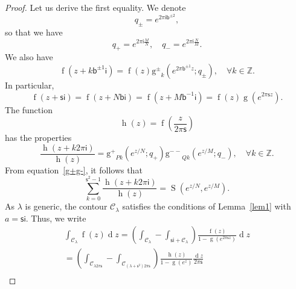\documentclass[12pt]{amsart}
\theoremstyle{definition}
\newcommand{\im}{\mathsf{i}}
\begin{document}
\begin{proof}
Let us derive the first equality. We denote
\begin{equation}
q_\pm= e^{2\pi\im\mathsf{b}^{\pm2}},
\end{equation}
so that we have
\begin{equation}
q_+=e^{2\pi\im\frac MN},\quad q_-=e^{2\pi\im\frac NM}.
\end{equation}
We also have
\begin{equation}
\operatorname{f}(z+k\mathsf{b}^{\pm1}\im)=\operatorname{f}(z)
\operatorname{g^\pm}_{k}\!\left(e^{2\pi\mathsf{b}^{\pm1}z};q_\pm\right), 
\quad \forall k\in\mathbb{Z}.
\end{equation}
In particular,
\begin{equation}
\operatorname{f}(z+\mathsf{s}\im)=\operatorname{f}(z+N\mathsf{b}\im)=
\operatorname{f}(z+M\mathsf{b}^{-1}\im)=
\operatorname{f}(z)\operatorname{g}\!\left(e^{2\pi\mathsf{s}z}\right).
\end{equation}
The function
\begin{equation}\label{hf}
\operatorname{h}(z)= \operatorname{f}\!
\left(\frac z{2\pi\mathsf{s}}\right)
\end{equation}
has the properties
\begin{equation}\label{g+g-}
\frac{\operatorname{h}(z+k2\pi \im)}{\operatorname{h}(z)}=
\operatorname{g^+}_{Pk}\!\left(e^{z/N};q_+\right)
\operatorname{g^{--}}_{Qk}\!\left(e^{z/M};q_-\right),\quad \forall k\in\mathbb{Z}.
\end{equation}
From equation~\eqref{g+g-}, it follows that
\begin{equation}\label{Sh}
\sum_{k=0}^{\mathsf{s}^2-1}
\frac{\operatorname{h}(z+k2\pi\im)}{\operatorname{h}(z)}=
\operatorname{S}\!\left(e^{z/N},e^{z/M}\right).
\end{equation}
As $\lambda$ is generic, the contour $\mathcal{C}_\lambda$ satisfies the 
conditions of Lemma~\ref{lem1} with $a=\mathsf{s}\im$.  Thus, we write
\begin{multline}\label{pro1}
\int_{\mathcal{C}_\lambda}\operatorname{f}(z)\operatorname{d}\!z=
\!\left(\int_{\mathcal{C}_\lambda}-\int_{\mathsf{s}\im+\mathcal{C}_\lambda}\right)
\frac{\operatorname{f}(z)}{1-\operatorname{g}\!\left(e^{2\pi\mathsf{s}z}\right)}
\operatorname{d}\!z \\
=\left(\int_{\mathcal{C}_{\lambda 2\pi\mathsf{s}}}
-\int_{\mathcal{C}_{(\lambda+\mathsf{s}^2) 2\pi\mathsf{s}}}\right)
\frac{\operatorname{h}(z)}{1-\operatorname{g}\!\left(e^{z}\right)}
\frac{\operatorname{d}\!z}{2\pi\mathsf{s}} \\

\end{multline}
\end{proof}
\end{document}
